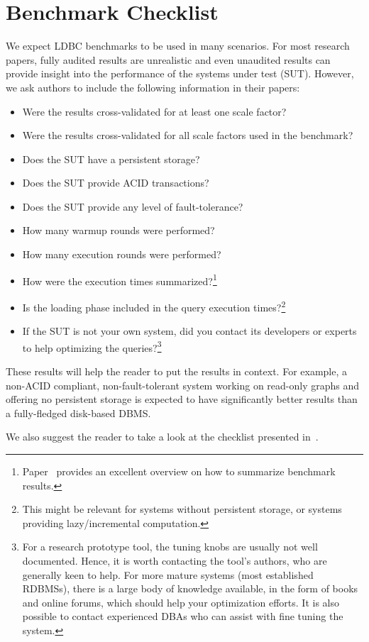 \chapter{Benchmark Checklist}
\label{sec:benchmark-checklist}

We expect LDBC benchmarks to be used in many scenarios.
For most research papers, fully audited results are unrealistic and even unaudited results can provide insight into the performance of the systems under test (SUT). However, we ask authors to include the following information in their papers:

\begin{itemize}
\item Were the results cross-validated for at least one scale factor?
\item Were the results cross-validated for all scale factors used in the benchmark?
\item Does the SUT have a persistent storage?
\item Does the SUT provide ACID transactions?
\item Does the SUT provide any level of fault-tolerance?
\item How many warmup rounds were performed?
\item How many execution rounds were performed?
\item How were the execution times summarized?\footnote{Paper~\cite{DBLP:conf/sc/HoeflerB15} provides an excellent overview on how to summarize benchmark results.}
\item Is the loading phase included in the query execution times?\footnote{This might be relevant for systems without persistent storage, or systems providing lazy/incremental computation.}
\item If the SUT is not your own system, did you contact its developers or experts to help optimizing the queries?\footnote{For a research prototype tool, the tuning knobs are usually not well documented. Hence, it is worth contacting the tool's authors, who are generally keen to help. For more mature systems (\eg most established RDBMSs), there is a large body of knowledge available, in the form of books and online forums, which should help your optimization efforts. It is also possible to contact experienced DBAs who can assist with fine tuning the system.}
\end{itemize}

These results will help the reader to put the results in context. For example, a non-ACID compliant, non-fault-tolerant system working on read-only graphs and offering no persistent storage is expected to have significantly better results than a fully-fledged disk-based DBMS.

We also suggest the reader to take a look at the checklist presented in~\cite{DBLP:conf/sigmod/RaasveldtHGM18}.
